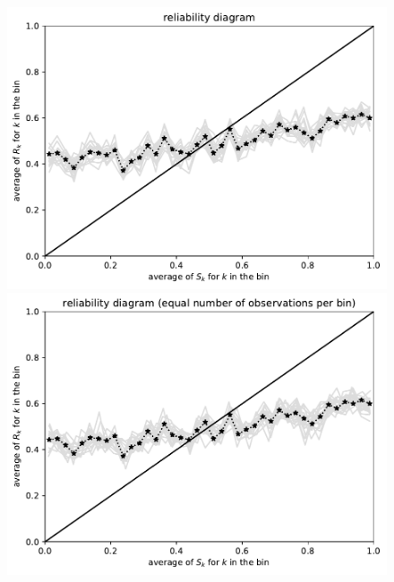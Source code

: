 \documentclass{article}
\begin{document}
\begin{figure}
\begin{centering}
\parbox{\imsize}{\includegraphics[width=\imsize]
                {./codes/unweighted/10000_40_0_0/equiprob.pdf}}
\quad\quad
\parbox{\imsize}{\includegraphics[width=\imsize]
                {./codes/unweighted/10000_40_0_0/equisamp.pdf}}

\vspace{\vertsep}


\end{centering}
\end{figure}
\end{document}
